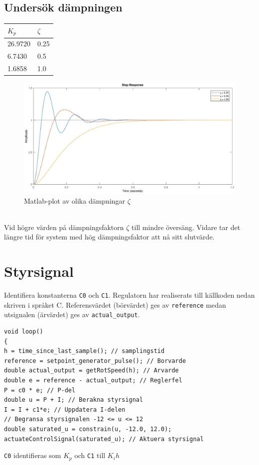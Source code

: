 \documentclass[11pt]{article}
\begin{document}
\subsection{Undersök dämpningen}
\begin{tabular}{|l|l|}
\hline
$K_p$&$\zeta$ \hspace*{1em} \\ \hline \hline 
26.9720 & 0.25 \\ \hline
6.7430&0.5\\ \hline
1.6858&1.0\\ \hline
\end{tabular}
\begin{figure}[h!]
\centering
\includegraphics[scale=0.45]{Figures/plot2}
\caption{Matlab-plot av olika dämpningar $\zeta$}
\end{figure}\\[1em]
Vid högre värden på dämpningsfaktorn $\zeta$ till mindre översäng. Vidare tar det längre tid för system med hög dämpningsfaktor att nå sitt slutvärde.

\section{Styrsignal}
Identifiera konstanterna \texttt{C0} och \texttt{C1}. Regulatorn har realiserats till källkoden nedan skriven i språket C. Referensvärdet (börvärdet) ges av \texttt{reference} medan utsignalen (ärvärdet) ges av \texttt{actual\_output}.

\begin{lstlisting}[frame=single]
void loop()
{
h = time_since_last_sample(); // samplingstid
reference = setpoint_generator_pulse(); // Borvarde
double actual_output = getRotSpeed(h); // Arvarde
double e = reference - actual_output; // Reglerfel
P = c0 * e; // P-del
double u = P + I; // Berakna styrsignal
I = I + c1*e; // Uppdatera I-delen
// Begransa styrsignalen -12 <= u <= 12
double saturated_u = constrain(u, -12.0, 12.0);
actuateControlSignal(saturated_u); // Aktuera styrsignal
\end{lstlisting} \vspace*{1em}

\texttt{C0} identifieras som $K_p$ och \texttt{C1} till $K_ih$
\end{document}
